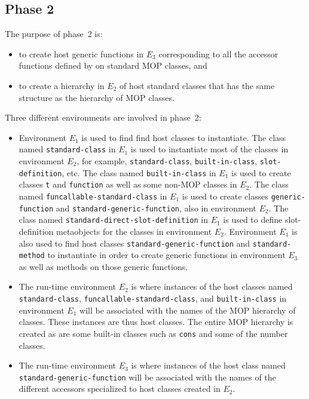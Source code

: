\subsection{Phase 2}

The purpose of phase~2 is:

\begin{itemize}
\item to create host generic functions in $E_3$ corresponding to all
  the accessor functions defined by \sysname{} on standard MOP
  classes, and
\item to create a hierarchy in $E_2$ of host standard classes that has
  the same structure as the hierarchy of MOP classes.
\end{itemize}


Three different environments are involved in phase~2:

\begin{itemize}
\item Environment $E_1$ is used to find find host classes to
  instantiate.  The class named \texttt{standard-class} in $E_1$ is
  used to instantiate most of the classes in environment $E_2$, for
  example, \texttt{standard-class}, \texttt{built-in-class},
  \texttt{slot-definition}, etc.  The class named
  \texttt{built-in-class} in $E_1$ is used to create classes
  \texttt{t} and \texttt{function} as well as some non-MOP classes in
  $E_2$.  The class named \texttt{funcallable-standard-class} in $E_1$
  is used to create classes \texttt{generic-function} and
  \texttt{standard-generic-function}, also in environment $E_2$.  The
  class named \texttt{standard-direct-slot-definition} in $E_1$ is
  used to define slot-definition metaobjects for the classes in
  environment $E_2$.  Environment $E_1$ is also used to find host
  classes \texttt{standard-generic-function} and
  \texttt{standard-method} to instantiate in order to create generic
  functions in environment $E_3$ as well as methods on those generic
  functions.
\item The run-time environment $E_2$ is where instances of the host
  classes named \texttt{standard-class},
  \texttt{funcallable-standard-class}, and \texttt{built-in-class} in
  environment $E_1$ will be associated with the names of the MOP
  hierarchy of classes.  These instances are thus host classes.  The
  entire MOP hierarchy is created as are some built-in classes such as
  \texttt{cons} and some of the number classes.
\item The run-time environment $E_3$ is where instances of the host
  class named \texttt{standard-generic-function} will be associated
  with the names of the different accessors specialized to host
  classes created in $E_2$.
\end{itemize}

